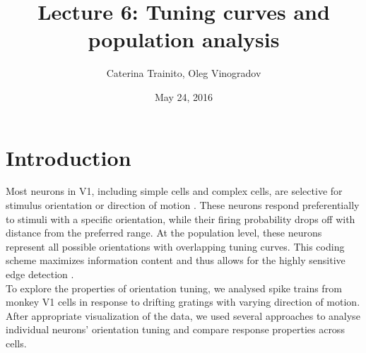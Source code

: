 \documentclass[10pt]{article}
\title{Lecture 6: Tuning curves and population analysis}
\author{Caterina Trainito, Oleg Vinogradov}
\date{May 24, 2016}
\begin{document}
\maketitle

\section*{Introduction}

Most neurons in V1, including simple cells and complex cells, are selective for stimulus orientation or direction of motion \cite{hubel1962receptive}. These neurons respond preferentially to stimuli with a specific orientation, while their firing probability drops off with distance from the preferred range. At the population level, these neurons represent all possible orientations with overlapping tuning curves. This coding scheme maximizes information content \cite{snippe1996parameter} and thus allows for the highly sensitive edge detection \cite{marr1980theory}. \\

To explore the properties of orientation tuning, we analysed spike trains from monkey V1 cells in response to drifting gratings with varying direction of motion. After appropriate visualization of the data, we used several approaches to analyse individual neurons' orientation tuning and compare response properties across cells.
\end{document}
